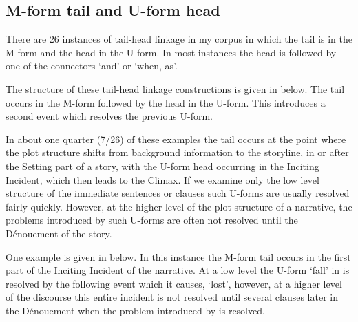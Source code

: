 \subsection{M-form tail and U-form head}\label{sec:MforTaiUforHea}
There are 26 instances of tail-head linkage
in my corpus in which the tail is in the M-form and the head in the U-form.
In most instances the head is followed by one of the connectors
 `and' or   `when, as'.

The structure of these tail-head linkage constructions
is given in  below.
The tail occurs in the M-form followed by the head in the U-form.
This introduces a second event which resolves the previous U-form.

\begin{exe}
	\label{ex:THL M/U}
\end{exe}

In about one quarter (7/26) of these examples
the tail occurs at the point where the plot structure
shifts from background information to the storyline,
in or after the Setting part of a story,
with the U-form head occurring in the Inciting Incident,
which then leads to the Climax.
If we examine only the low level structure
of the immediate sentences or clauses
such U-forms are usually resolved fairly quickly.
However, at the higher level of the plot structure of a narrative,
the problems introduced by such U-forms
are often not resolved until the Dénouement of the story.

One example is given in  below.
In this instance the M-form tail occurs in the first part
of the Inciting Incident of the narrative.
At a low level the U-form  `fall' in 
is resolved by the following event which it causes,  `lost',
however, at a higher level of the discourse this
entire incident is not resolved until
several clauses later in the Dénouement when the
problem introduced by  is resolved.

